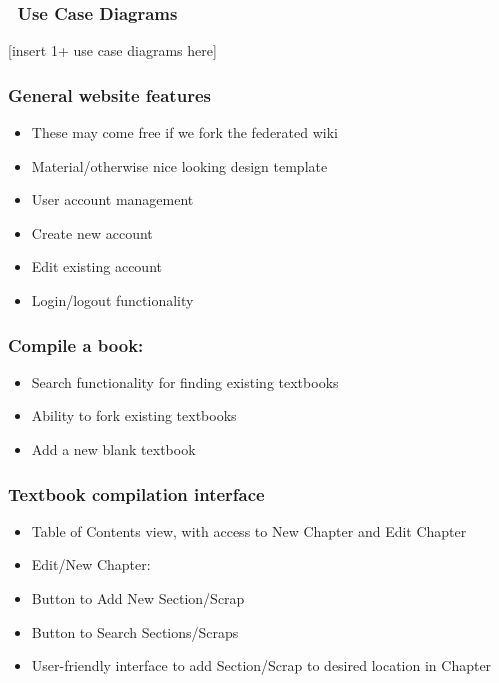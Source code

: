 \documentclass[letterpaper, 10pt, draftclsnofoot, onecolumn]{IEEEtran}
\begin{document}
{{\subsubsection[\ Use Case
Diagrams]{\foreignlanguage{english}{\ }\foreignlanguage{english}{Use
Case Diagrams}}
{\color{black}
[insert 1+ use case diagrams here]}

\subsubsection[System feature 1: [ General Website Features
{]}]{\rmfamily\bfseries\color{black} General website features
}
\begin{itemize}
\item These may come free if we fork the federated wiki
\item Material/otherwise nice looking design template
\item User account management
\item Create new account
\item Edit existing account
\item Login/logout functionality
\end{itemize}

\subsubsection[System feature 2: [ Compile a book
{]}]{\rmfamily\bfseries\color{black} Compile a book:
}
\begin{itemize}
\item Search functionality for finding existing textbooks
\item Ability to fork existing textbooks
\item Add a new blank textbook
\end{itemize}

\subsubsection[System feature 3: [ Textbook Compilation Interface
{]}]{\rmfamily\bfseries\color{black} Textbook compilation interface
}
\begin{itemize}
\item Table of Contents view, with access to New Chapter and Edit Chapter
\item Edit/New Chapter:
\item Button to Add New Section/Scrap
\item Button to Search Sections/Scraps
\item User-friendly interface to add Section/Scrap to desired location in Chapter
\end{itemize}

}}
\end{document}
